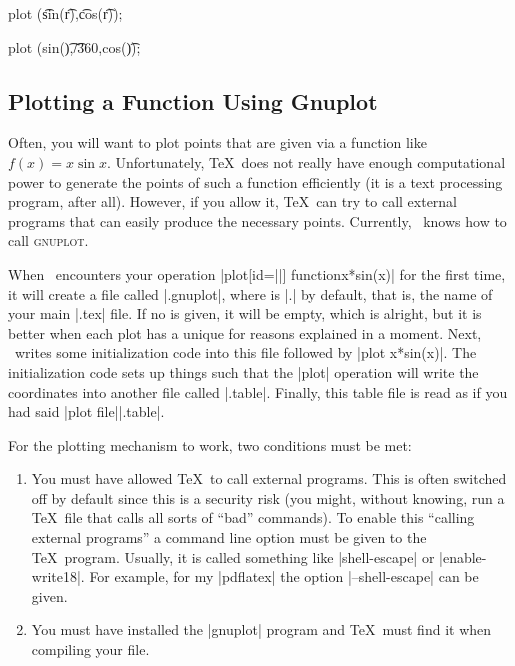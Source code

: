 \begin{codeexample}[]
\tikz \draw[scale=0.5,domain=-3.141:3.141,smooth,variable=\t]
  plot ({\t*sin(\t r)},{\t*cos(\t r)});
\end{codeexample}

\begin{codeexample}[]
\tikz \draw[domain=0:360,smooth,variable=\t]
  plot ({sin(\t)},\t/360,{cos(\t)});
\end{codeexample}


\subsection{Plotting a Function Using Gnuplot}
\label{section-tikz-gnuplot}

Often, you will want to plot points that are given via a function like $f(x) =
x \sin x$. Unfortunately, \TeX\ does not really have enough computational power
to generate the points of such a function efficiently (it is a text processing
program, after all). However, if you allow it, \TeX\ can try to call external
programs that can easily produce the necessary points. Currently, \tikzname\
knows how to call \textsc{gnuplot}.

When \tikzname\ encounters your operation
|plot[id=||] function{x*sin(x)}| for the first time, it will create a
file called |.gnuplot|, where \meta{prefix} is
|\jobname.| by default, that is, the name of your main |.tex| file. If no
 is given, it will be empty, which is alright, but it is better when
each plot has a unique \meta{id} for reasons explained in a moment. Next,
\tikzname\ writes some initialization code into this file followed by
|plot x*sin(x)|. The initialization code sets up things such that the |plot|
operation will write the coordinates into another file called
|.table|. Finally, this table file is read as if you had
said |plot file{|\meta{prefix}\meta{id}|.table}|.

For the plotting mechanism to work, two conditions must be met:
%
\begin{enumerate}
    \item You must have allowed \TeX\ to call external programs. This is often
        switched off by default since this is a security risk (you might,
        without knowing, run a \TeX\ file that calls all sorts of ``bad''
        commands). To enable this ``calling external programs'' a command line
        option must be given to the \TeX\ program. Usually, it is called
        something like |shell-escape| or |enable-write18|. For example, for my
        |pdflatex| the option |--shell-escape| can be given.
    \item You must have installed the |gnuplot| program and \TeX\ must find it
        when compiling your file.
\end{enumerate}

